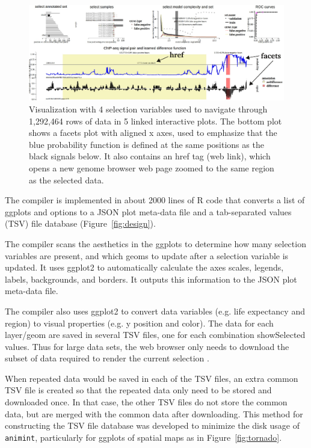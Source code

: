 \documentclass[journal]{vgtc}\usepackage[]{graphicx}\usepackage[]{color}
\begin{document}
\begin{figure}[b!]
  \centering
  \includegraphics[width=\textwidth]{figure-chip-seq}
  \caption{Visualization with 4 selection variables used to navigate
    through 1,292,464 rows of data in 5 linked interactive plots. The
    bottom plot shows a facets plot with aligned x axes, used to
    emphasize that the blue probability function is defined at the
    same positions as the black signals below. It also contains an
    href tag (web link), which opens a new genome browser web page
    zoomed to the same region as the selected data.}
  \label{fig:ChIPseq}
\end{figure}

The compiler is implemented in about 2000 lines of R code that
converts a list of ggplots and options to a JSON plot meta-data file
and a tab-separated values (TSV) file database
(Figure~\ref{fig:design}).

The compiler scans the aesthetics in the ggplots to determine
how many selection variables are present, and which geoms to update
after a selection variable is updated. It uses ggplot2 to
automatically calculate the axes scales, legends, labels, backgrounds,
and borders. It outputs this information to the JSON plot meta-data
file.

The compiler also uses ggplot2 to convert data variables (e.g. life
expectancy and region) to visual properties (e.g. y position and
color). The data for each layer/geom are saved in several TSV files,
one for each combination showSelected values. Thus for large data
sets, the web browser only needs to download the subset of data
required to render the current selection \citep{2013-immens}.

When repeated data would be saved in each of the TSV files, an extra
common TSV file is created so that the repeated data only need to be
stored and downloaded once. In that case, the other TSV files do not
store the common data, but are merged with the common data after
downloading. This method for constructing the TSV file database was
developed to minimize the disk usage of \texttt{animint}, particularly
for ggplots of spatial maps as in Figure~\ref{fig:tornado}.
\end{document}
